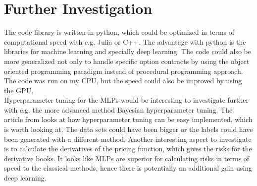 \section{Further Investigation}
The code library is written in python, which could be optimized in terms of computational speed with e.g. Julia or C++. The advantage with python is the libraries for machine learning and specially deep learning. The code could also be more generalized not only to handle specific option contracts by using the object oriented programming paradigm instead of procedural programming approach. The code was run on my CPU, but the speed could also be improved by using the GPU.\\

Hyperparameter tuning for the MLPs would be interesting to investigate further with e.g. the more advanced method Bayesian hyperparameter tuning. The article from \parencite{liaw2018tune} looks at how hyperparameter tuning can be easy implemented, which is worth looking at. The data sets could have been bigger or the labels could have been generated with a different method. Another interesting aspect to investigate is to calculate the derivatives of the pricing function, which gives the risks for the derivative books. It looks like MLPs are superior for calculating risks in terms of speed to the classical methods, hence there is potentially an additional gain using deep learning.\\


